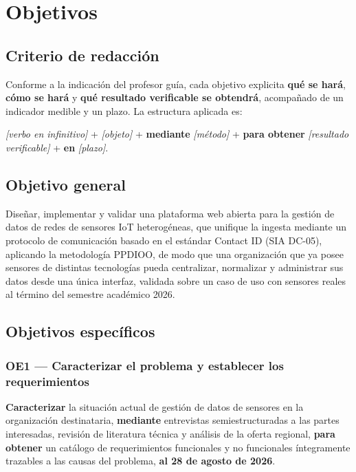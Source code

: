 \section{Objetivos}
\label{sec:objetivos}

\subsection{Criterio de redacción}

Conforme a la indicación del profesor guía, cada objetivo explicita \textbf{qué se hará}, \textbf{cómo
se hará} y \textbf{qué resultado verificable se obtendrá}, acompañado de un indicador medible y un
plazo. La estructura aplicada es:

\begin{cajadefinicion}
\emph{[verbo en infinitivo]} + \emph{[objeto]} + \textbf{mediante} \emph{[método]} + \textbf{para
obtener} \emph{[resultado verificable]} + \textbf{en} \emph{[plazo]}.
\end{cajadefinicion}

\subsection{Objetivo general}

\begin{cajaclave}[title={Objetivo general}]
Diseñar, implementar y validar una plataforma web abierta para la gestión de datos de redes de sensores
IoT heterogéneas, que unifique la ingesta mediante un protocolo de comunicación basado en el estándar
Contact ID (SIA DC-05), aplicando la metodología PPDIOO, de modo que una organización que ya posee
sensores de distintas tecnologías pueda centralizar, normalizar y administrar sus datos desde una única
interfaz, validada sobre un caso de uso con sensores reales al término del semestre académico 2026.
\end{cajaclave}

\subsection{Objetivos específicos}

\subsubsection{OE1 --- Caracterizar el problema y establecer los requerimientos}

\begin{cajadefinicion}
\textbf{Caracterizar} la situación actual de gestión de datos de sensores en la organización
destinataria, \textbf{mediante} entrevistas semiestructuradas a las partes interesadas, revisión de
literatura técnica y análisis de la oferta regional, \textbf{para obtener} un catálogo de requerimientos
funcionales y no funcionales íntegramente trazables a las causas del problema, \textbf{al 28 de agosto
de 2026}.
\end{cajadefinicion}

